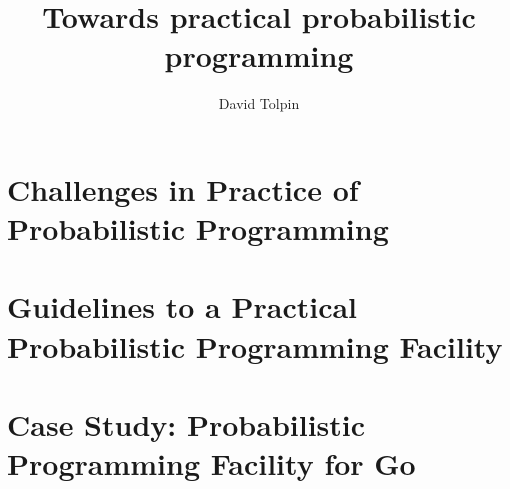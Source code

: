 \documentclass[sigplan,review]{acmart}\settopmatter{printfolios=true,printccs=false,printacmref=false}
\begin{document}
\title{Towards practical probabilistic programming}
\author{David Tolpin}


\maketitle


\section{Challenges in Practice of Probabilistic Programming}

\section{Guidelines to a Practical Probabilistic Programming
Facility}

\section{Case Study: Probabilistic Programming Facility for
Go}


\end{document}

